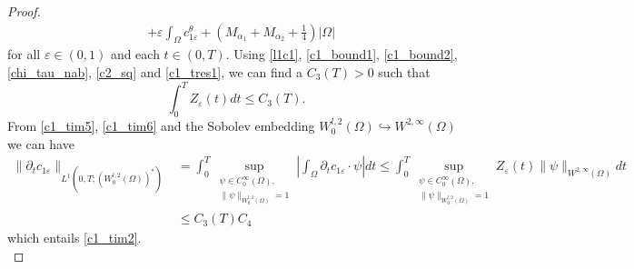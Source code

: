 \documentclass[10pt,a4paper]{amsart}
\begin{document}
\begin{proof}
\begin{align*}
    & + \varepsilon \int_\Omega c_{1\varepsilon}^\theta + (M_{\alpha_1} + M_{\alpha_2} + \tfrac{1}{4}) |\Omega|
  \end{align*}
for all $\varepsilon \in (0, 1)$ and each $t \in (0, T)$. Using \eqref{l1c1}, \eqref{c1_bound1}, \eqref{c1_bound2}, \eqref{chi_tau_nab}, \eqref{c2_sq} and \eqref{c1_tres1}, we can find a $C_3(T) > 0$ such that
\begin{equation}
 \label{c1_tim6}
  \int_0^T Z_\varepsilon(t) dt \leq C_3(T).
\end{equation}
\noindent
From \eqref{c1_tim5}, \eqref{c1_tim6} and the Sobolev embedding $W_0^{l, 2}(\Omega) \hookrightarrow W^{2, \infty}(\Omega)$ we can have
\begin{align*}
   \|\partial_t c_{1\varepsilon}\|_{L^1(0, T; (W_0^{l, 2}(\Omega))^\ast)} & = \int_0^T \sup_{\substack{\psi \in C_0^\infty(\Omega),\\ \|\psi\|_{W^{l, 2}_0(\Omega)} = 1}} \left|\int_\Omega \partial_t c_{1\varepsilon} \cdot \psi \right| dt  \leq \int_0^T \sup_{\substack{\psi \in C_0^\infty(\Omega),\\ \|\psi\|_{W^{l, 2}_0(\Omega)} = 1}} Z_\varepsilon(t) \|\psi\|_{W^{2, \infty}(\Omega)} dt  \\[5pt]
   & \leq C_3(T) C_4
  \end{align*}
which entails \eqref{c1_tim2}.\\[-2ex]


\end{proof}
\end{document}
